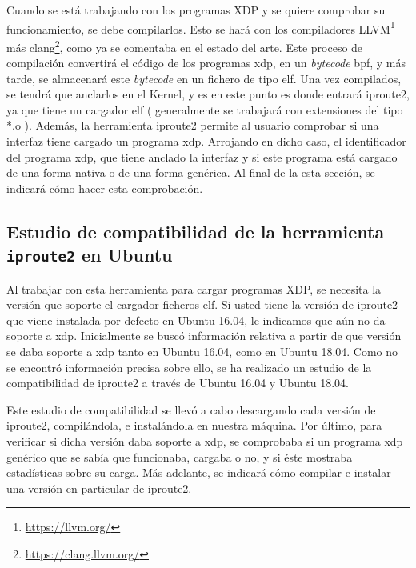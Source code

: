 Cuando se está trabajando con los programas XDP y se quiere comprobar su funcionamiento, se debe compilarlos. Esto se hará con los compiladores LLVM\footnote{\url{https://llvm.org/}} más clang\footnote{\url{https://clang.llvm.org/}}, como ya se comentaba en el estado del arte. Este proceso de compilación convertirá el código de los programas \gls{xdp}, en un \textit{bytecode} \gls{bpf}, y más tarde, se almacenará este \textit{bytecode} en un fichero de tipo \gls{elf}. Una vez compilados, se tendrá que anclarlos en el Kernel, y es  en este punto es donde entrará iproute2, ya que tiene un cargador \gls{elf} ( generalmente se trabajará con extensiones del tipo *.o ). \newline
\newline
Además, la herramienta iproute2 permite al usuario comprobar si una interfaz tiene cargado un programa \gls{xdp}. Arrojando en dicho caso, el identificador del programa \gls{xdp}, que tiene anclado la interfaz y si este programa está cargado de una forma nativa o de una forma genérica. Al final de la esta sección, se indicará cómo hacer esta comprobación.

\subsection{Estudio de compatibilidad de la herramienta \texttt{iproute2} en Ubuntu}

Al trabajar con esta herramienta para cargar programas XDP, se necesita  la versión que soporte el cargador ficheros \gls{elf}. Si usted tiene la versión de iproute2 que viene instalada por defecto en Ubuntu 16.04, le indicamos que aún no da soporte a \gls{xdp}. Inicialmente se buscó información relativa a partir de que versión se daba soporte a \gls{xdp} tanto en Ubuntu 16.04, como en Ubuntu 18.04. Como no se encontró información precisa sobre ello, se ha realizado un estudio de la compatibilidad de iproute2 a través de Ubuntu 16.04 y Ubuntu 18.04.\\
\par

Este estudio de compatibilidad se llevó a cabo descargando cada versión de iproute2, compilándola, e instalándola en nuestra máquina. Por último, para verificar si dicha versión daba soporte a \gls{xdp}, se comprobaba si un programa \gls{xdp} genérico que se sabía que funcionaba, cargaba o no, y si éste mostraba estadísticas sobre su carga. Más adelante, se indicará cómo compilar e instalar una versión en particular de iproute2.  \\
\par

